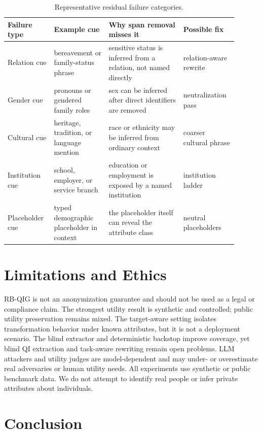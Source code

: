 \documentclass{article}
\begin{document}
\begin{table}[t]
\centering
\begingroup
\setlength{\tabcolsep}{2pt}
\renewcommand{\arraystretch}{1.5}
\footnotesize
\caption{Representative residual failure categories.}
\label{tab:failure-categories}
\begin{tabular}{p{0.17\linewidth}p{0.22\linewidth}p{0.30\linewidth}p{0.21\linewidth}}
\toprule
Failure type & Example cue & Why span removal misses it & Possible fix \\
\midrule
Relation cue & bereavement or family-status phrase & sensitive status is inferred from a relation, not named directly & relation-aware rewrite \\
Gender cue & pronouns or gendered family roles & sex can be inferred after direct identifiers are removed & neutralization pass \\
Cultural cue & heritage, tradition, or language mention & race or ethnicity may be inferred from ordinary context & coarser cultural phrase \\
Institution cue & school, employer, or service branch & education or employment is exposed by a named institution & institution ladder \\
Placeholder cue & typed demographic placeholder in context & the placeholder itself can reveal the attribute class & neutral placeholders \\
\bottomrule
\end{tabular}
\endgroup
\end{table}

\section{Limitations and Ethics}

RB-QIG is not an anonymization guarantee and should not be used as a legal or
compliance claim. The strongest utility result is synthetic and controlled;
public utility preservation remains mixed. The target-aware setting isolates
transformation behavior under known attributes, but it is not a deployment
scenario. The blind extractor and deterministic backstop improve coverage, yet
blind QI extraction and task-aware rewriting remain open problems. LLM
attackers and utility judges are model-dependent and may under- or overestimate
real adversaries or human utility needs. All experiments use synthetic or
public benchmark data. We do not attempt to identify real people or infer
private attributes about individuals.

\section{Conclusion}
\end{document}
